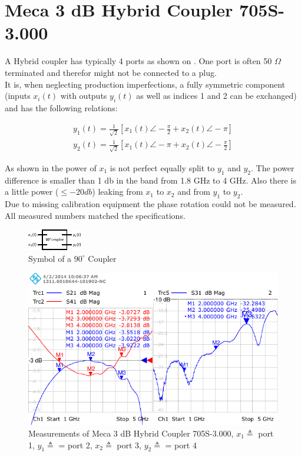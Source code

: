 \section{Meca 3 dB Hybrid Coupler 705S-3.000}
\label{sec:comp_90deg}

A Hybrid coupler has typically 4 ports as shown on
.
One port is often 50 $\Omega$ terminated and therefor might not be connected
to a plug. \\

It is, when neglecting production imperfections, a fully symmetric component
(inputs $x_i(t)$ with outputs $y_i(t)$ as well as indices 1 and 2
can be exchanged) and has the following relations:

\begin{align}
  y_1(t) = \frac{1}{\sqrt{2}} \left[x_1(t) \angle -\frac{\pi}{2} + x_2(t) \angle -\pi \right] \\
  y_2(t) = \frac{1}{\sqrt{2}} \left[x_1(t) \angle -\pi + x_2(t) \angle -\frac{\pi}{2} \right]
\end{align}

As shown in  the power of
$x_1$ is not perfect equally split to $y_1$ and $y_2$. The power difference
is smaller than 1 db in the band from 1.8 GHz to 4 GHz.
Also there is a little power ($\leq -20 db$) leaking from $x_1$ to $x_2$ and from
$y_1$ to $y_2$. \\

Due to missing calibration equipment the phase rotation could not be measured.
All measured numbers matched the specifications.

\begin{figure}
  \centering
  \includegraphics{figures/90deg_coupler_symbol}
  \caption{Symbol of a $90^\circ$ Coupler}
  \label{fig:90deg_coupler_symbol}
\end{figure}

\begin{figure}
  \centering
  \includegraphics[width=\textwidth]{figures/Meca_705S-3_coupler_id1}
  \caption{Measurements of Meca 3 dB Hybrid Coupler 705S-3.000,
    $x_1 \triangleq $ port 1, $y_1 \triangleq $ = port 2,
    $x_2 \triangleq $ port 3, $y_2 \triangleq $ = port 4}
  \label{fig:90deg_coupler_measurement}
\end{figure}

